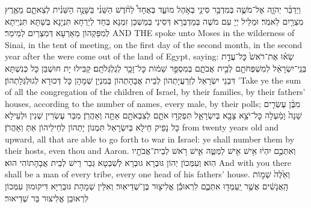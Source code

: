 {וַיְדַבֵּ֨ר יְהֹוָ֧ה אֶל־מֹשֶׁ֛ה בְּמִדְבַּ֥ר סִינַ֖י בְּאֹ֣הֶל מוֹעֵ֑ד בְּאֶחָד֩ לַחֹ֨דֶשׁ הַשֵּׁנִ֜י בַּשָּׁנָ֣ה הַשֵּׁנִ֗ית לְצֵאתָ֛ם מֵאֶ֥רֶץ מִצְרַ֖יִם לֵאמֹֽר׃
}
{וּמַלֵּיל יְיָ עִם מֹשֶׁה בְּמַדְבְּרָא דְּסִינַי בְּמַשְׁכַּן זִמְנָא בְּחַד לְיַרְחָא תִּנְיָנָא בְּשַׁתָּא תִּנְיֵיתָא לְמִפַּקְהוֹן מֵאַרְעָא דְּמִצְרַיִם לְמֵימַר׃}
{AND THE \lord\space spoke unto Moses in the wilderness of Sinai, in the tent of meeting, on the first day of the second month, in the second year after the were come out of the land of Egypt, saying:}{}
{שְׂא֗וּ אֶת־רֹאשׁ֙ כׇּל־עֲדַ֣ת בְּנֵֽי־יִשְׂרָאֵ֔ל לְמִשְׁפְּחֹתָ֖ם לְבֵ֣ית אֲבֹתָ֑ם בְּמִסְפַּ֣ר שֵׁמ֔וֹת כׇּל־זָכָ֖ר לְגֻלְגְּלֹתָֽם׃
}
{קַבִּילוּ יָת חוּשְׁבַּן כָּל כְּנִשְׁתָּא דִּבְנֵי יִשְׂרָאֵל לְזַרְעֲיָתְהוֹן לְבֵית אֲבָהָתְהוֹן בְּמִנְיַן שְׁמָהָן כָּל דְּכוּרָא לְגוּלְגְּלָתְהוֹן׃}
{’Take ye the sum of all the congregation of the children of Israel, by their families, by their fathers’ houses, according to the number of names, every male, by their polls;}{}
{מִבֶּ֨ן עֶשְׂרִ֤ים שָׁנָה֙ וָמַ֔עְלָה כׇּל־יֹצֵ֥א צָבָ֖א בְּיִשְׂרָאֵ֑ל תִּפְקְד֥וּ אֹתָ֛ם לְצִבְאֹתָ֖ם אַתָּ֥ה וְאַהֲרֹֽן׃
}
{מִבַּר עֶשְׂרִין שְׁנִין וּלְעֵילָא כָּל נָפֵיק חֵילָא בְּיִשְׂרָאֵל תִּמְנוֹן יָתְהוֹן לְחֵילֵיהוֹן אַתְּ וְאַהֲרֹן׃}
{from twenty years old and upward, all that are able to go forth to war in Israel: ye shall number them by their hosts, even thou and Aaron.}{}
{וְאִתְּכֶ֣ם יִהְי֔וּ אִ֥ישׁ אִ֖ישׁ לַמַּטֶּ֑ה אִ֛ישׁ רֹ֥אשׁ לְבֵית־אֲבֹתָ֖יו הֽוּא׃
}
{וְעִמְּכוֹן יְהוֹן גּוּבְרָא גּוּבְרָא לְשִׁבְטָא גְּבַר רֵישׁ לְבֵית אֲבָהָתוֹהִי הוּא׃}
{And with you there shall be a man of every tribe, every one head of his fathers’ house.}{}
{וְאֵ֙לֶּה֙ שְׁמ֣וֹת הָֽאֲנָשִׁ֔ים אֲשֶׁ֥ר יַֽעַמְד֖וּ אִתְּכֶ֑ם לִרְאוּבֵ֕ן אֱלִיצ֖וּר בֶּן־שְׁדֵיאֽוּר׃}
{וְאִלֵּין שְׁמָהָת גּוּבְרַיָּא דִּיקוּמוּן עִמְּכוֹן לִרְאוּבֵן אֱלִיצוּר בַּר שְׁדֵיאוּר׃}
